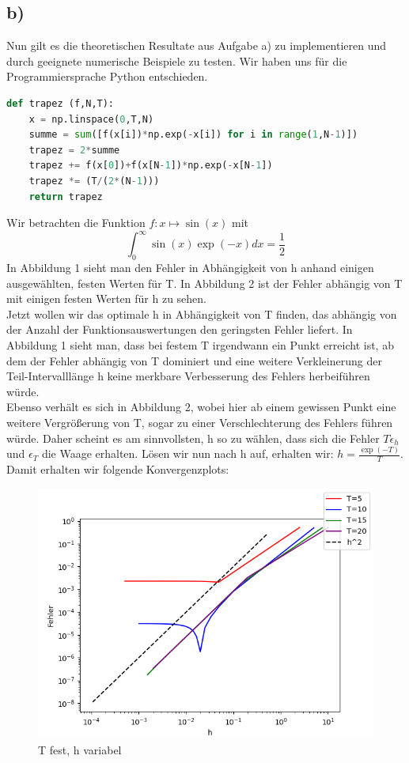 \subsection*{b)}
Nun gilt es die theoretischen Resultate aus Aufgabe a) zu implementieren und durch geeignete numerische Beispiele zu testen.
Wir haben uns für die Programmiersprache Python entschieden. 
\begin{lstlisting}[language=Python]
def trapez (f,N,T):
    x = np.linspace(0,T,N)
    summe = sum([f(x[i])*np.exp(-x[i]) for i in range(1,N-1)])
    trapez = 2*summe
    trapez += f(x[0])+f(x[N-1])*np.exp(-x[N-1])
    trapez *= (T/(2*(N-1)))
    return trapez
\end{lstlisting}
Wir betrachten die Funktion $f: x \mapsto \sin(x)$ mit
\[\int_{0}^{\infty}\sin(x)\exp(-x)dx = \frac{1}{2}\]
In Abbildung 1 sieht man den Fehler in Abhängigkeit von h anhand einigen ausgewählten, festen Werten für T.
In Abbildung 2 ist der Fehler abhängig von T mit einigen festen Werten für h zu sehen.\\
Jetzt wollen wir das optimale h in Abhängigkeit von T finden, das abhängig von der Anzahl der Funktionsauswertungen den geringsten Fehler liefert. In Abbildung 1 sieht man, dass bei festem T irgendwann ein Punkt erreicht ist, ab dem der Fehler abhängig von T dominiert und eine weitere Verkleinerung der Teil-Intervalllänge h keine merkbare Verbesserung des Fehlers herbeiführen würde.\\ Ebenso verhält es sich in Abbildung 2, wobei hier ab einem gewissen Punkt eine weitere Vergrößerung von T, sogar zu einer Verschlechterung des Fehlers führen würde. Daher scheint es am sinnvollsten, h so zu wählen, dass sich die Fehler $T\epsilon_h$ und $\epsilon_T$ die Waage erhalten. Lösen wir nun nach h auf, erhalten wir: $h = \frac{\exp(-T)}{T}$.\\
Damit erhalten wir folgende Konvergenzplots:
\begin{figure}
    \centering
    \includegraphics[width=\linewidth]{Aufgabe_1/fehler_h.png}
    \caption{T fest, h variabel}
    \label{fig:my_label}
\end{figure}



